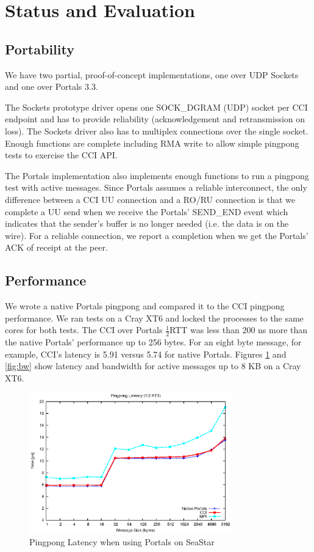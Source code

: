 \section{Status and Evaluation}
\label{sec:evaluation}

\subsection{Portability}
We have two partial, proof-of-concept implementations, one over UDP Sockets and
one over Portals 3.3.

The Sockets prototype driver opens one SOCK\_DGRAM (UDP) socket per CCI endpoint
and has to provide reliability (acknowledgement and retransmission on loss).
The Sockets driver also has to multiplex connections over the single socket.
Enough functions are complete including RMA write to allow simple pingpong
tests to exercise the CCI API.

The Portals implementation also implements enough functions to run a pingpong
test with active messages. Since Portals assumes a reliable interconnect, the
only difference between a CCI UU connection and a RO/RU connection is that we
complete a UU send when we receive the Portals' SEND\_END event which indicates
that the sender's buffer is no longer needed (i.e. the data is on the wire).
For a reliable connection, we report a completion when we get the Portals' ACK
of receipt at the peer.

\subsection{Performance}
We wrote a native Portals pingpong and compared it to the CCI pingpong
performance. We ran tests on a Cray XT6 and locked the processes to the same
cores for both tests. The CCI over Portals \begin{math}\frac{1}{2}\end{math}RTT
was less than 200 ns more than the native Portals' performance up to 256 bytes.
For an eight byte message, for example, CCI's latency is 5.91 \us versus 5.74
\us for native Portals. Figures \ref{fig:latency} and \ref{fig:bw} show latency
and bandwidth for active messages up to 8 KB on a Cray XT6.

\begin{figure}[htbp]
\centering
\includegraphics[width=3.45in]{pingpong-latency.eps}
\caption{Pingpong Latency when using Portals on SeaStar}
\label{fig:latency}
\end{figure}

